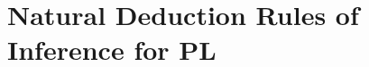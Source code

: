 

\fi





\section*{\hfill \normalsize \bf Natural Deduction Rules of Inference for PL \hfill} 
\label{nd-proofrules}
				
